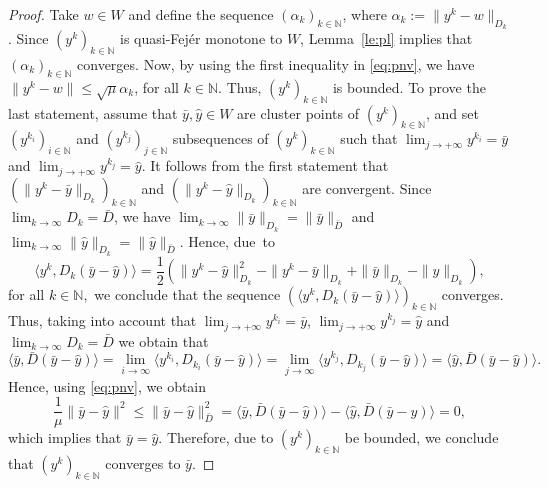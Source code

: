 \begin{proof}
	Take $w\in W$ and define the sequence $(\alpha_k)_{k\in\mathbb{N}}$, where $\alpha_k:=\|y^{k}-w\|_{D_{k}}$. Since $(y^k)_{k\in\mathbb{N}}$ is quasi-Fej\'er  monotone to $W$, Lemma~\ref{le:pl} implies that $(\alpha_k)_{k\in\mathbb{N}}$ converges. Now, by using  the  first  inequality in \eqref{eq:pnv}, we have  $\|y^{k}-w\|\leq \sqrt{\mu} \alpha_k$, for all $k\in  \mathbb{N}$.  Thus, $(y^k)_{k\in\mathbb{N}}$ is bounded. To prove the last statement, assume that   ${\bar y}, {\hat y} \in  W$   are  cluster points of $(y^k)_{k\in\mathbb{N}}$, and set   $(y^{k_i})_{i\in\mathbb{N}}$ and  $(y^{k_j})_{j\in\mathbb{N}}$  subsequences  of $(y^k)_{k\in\mathbb{N}}$ such that $\lim_{j\to +\infty} y^{k_i} = {\bar y}$ and $\lim_{j\to +\infty} y^{k_j} = {\hat y}$. It follows from the first statement that  $(\|y^{k}- {\bar y}\|_{D_{k}})_{k\in\mathbb{N}}$ and  $(\|y^{k}- {\hat y}\|_{D_{k}})_{k\in\mathbb{N}}$ are convergent. Since $\lim_{k\rightarrow\infty}D_k={\bar D}$, we have  $\lim_{k\rightarrow\infty}\|{\bar y}\|_{D_k}={\|\bar y}\|_{{\bar D}}$ and $\lim_{k\rightarrow\infty}\|{\hat y}\|_{D_k}={\|\hat y}\|_{{\bar D}}$. Hence,  due~to
	$$
		\langle y^k,  D_k({\bar y}- {\hat y})\rangle=\frac{1}{2}(\|y^{k}- {\hat y}\|_{D_{k}}^2-\|y^{k}- {\bar y}\|_{D_{k}} +\| {\bar y}\|_{D_{k}}-\| {\hat y}\|_{D_{k}}),
	$$
	for all $k\in {\mathbb N},$ we conclude that the sequence  $(\langle  y^k,  D_k({\bar y}- {\hat y})\rangle)_{k\in\mathbb{N}}$ converges.  Thus, taking into account that   $\lim_{j\to +\infty} y^{k_i} = {\bar y}$, $\lim_{j\to +\infty} y^{k_j} = {\hat y}$ and  $\lim_{k\rightarrow\infty}D_k={\bar D}$ we obtain that
	$$
		\langle  {\bar y},  {\bar D}({\bar y}- {\hat y})\rangle=\lim_{i\rightarrow\infty} \langle y^{k_i},  D_{k_i}({\bar y}- {\hat y})\rangle=\lim_{j\rightarrow\infty} \langle y^{k_j},  D_{k_j}({\bar y}- {\hat y})\rangle= \langle  {\hat y},  {\bar D}({\bar y}- {\hat y})\rangle.
	$$
	Hence, using \eqref{eq:pnv}, we obtain
	$$
		\frac{1}{\mu}\|{\bar y}- {\hat y}\|^2\leq  \|{\bar y}- {\hat y}\|^2_{\bar D}=  \langle  {\bar y},  {\bar D}({\bar y}- {\hat y})\rangle-  \langle  {\hat y},  {\bar D}({\bar y}- {\hat y})\rangle=0,
	$$
	which implies that ${\bar y}= {\hat y}$. Therefore, due to  $(y^k)_{k\in\mathbb{N}}$ be bounded, we conclude that    $(y^k)_{k\in\mathbb{N}}$ converges to ${\bar y}$.
\end{proof}


